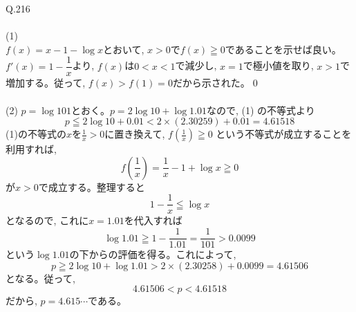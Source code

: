 \documentclass[twocolumn]{jbook}
\theoremstyle{definition}
\renewcommand{\leq}{\leqq}
\renewcommand{\geq}{\geqq}
\begin{document}
{\Large Q.216}\\
\\
(1)\\
$f(x)=x-1- \log{x} $とおいて, $x>0$で$f(x)\geq 0$であることを示せば良い。\\
$f'(x) = 1- \dfrac{1}{x}$より, $f(x)$は$0<x<1$で減少し, $x=1$で極小値を取り, $x>1$で増加する。従って, $f(x)>f(1) = 0$だから示された。\qed\\
\\
(2) $p=\log{101}$とおく。$p=2\log{10}+\log{1.01}$なので, (1) の不等式より
\[p\leq 2\log{10}+ 0.01 < 2\times (2.30259) + 0.01 = 4.61518\]
(1)の不等式の$x$を$\frac{1}{x}>0$に置き換えて, $f(\frac{1}{x})\geq 0$ という不等式が成立することを利用すれば, 
\[f(\frac{1}{x})= \dfrac{1}{x}- 1 + \log{x} \geq 0\]
が$x>0$で成立する。整理すると
\[1-\dfrac{1}{x}\leq \log{x}\]
となるので, これに$x=1.01$を代入すれば
\[\log{1.01} \geq 1- \dfrac{1}{1.01} = \dfrac{1}{101} > 0.0099\]
という$\log{1.01}$の下からの評価を得る。これによって, 
\[p \geq 2\log{10} + \log{1.01}  > 2\times (2.30258) + 0.0099 =4.61506 \]
となる。従って,
\[4.61506 < p < 4.61518\]
だから, $p= 4.615\cdots $である。
\end{document}
